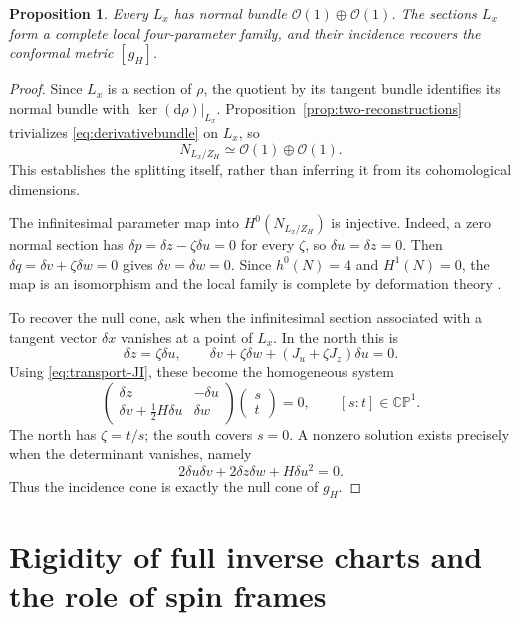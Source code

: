 \documentclass[11pt]{article}
\numberwithin{equation}{section}
\newtheorem{proposition}[theorem]{Proposition}
\theoremstyle{definition}
\theoremstyle{remark}
\newcommand{\CP}{\mathbb{CP}}
\newcommand{\OO}{\mathcal O}
\newcommand{\dd}{\mathrm d}
\begin{document}
\begin{proposition}\label{prop:normalbundle}
Every $L_x$ has normal bundle $\OO(1)\oplus\OO(1)$. The sections $L_x$ form a complete local four-parameter family, and their incidence recovers the conformal metric $[g_H]$.
\end{proposition}
\begin{proof}
Since $L_x$ is a section of $\rho$, the quotient by its tangent bundle identifies its normal bundle with $\ker(\dd\rho)|_{L_x}$. Proposition~\ref{prop:two-reconstructions} trivializes \eqref{eq:derivativebundle} on $L_x$, so
\begin{equation}\label{eq:normalbundle}
N_{L_x/Z_H}\simeq\OO(1)\oplus\OO(1).
\end{equation}
This establishes the splitting itself, rather than inferring it from its cohomological dimensions.

The infinitesimal parameter map into $H^0(N_{L_x/Z_H})$ is injective. Indeed, a zero normal section has $\delta p=\delta z-\zeta\delta u=0$ for every $\zeta$, so $\delta u=\delta z=0$. Then $\delta q=\delta v+\zeta\delta w=0$ gives $\delta v=\delta w=0$. Since $h^0(N)=4$ and $H^1(N)=0$, the map is an isomorphism and the local family is complete by deformation theory \cite{Kodaira}.

To recover the null cone, ask when the infinitesimal section associated with a tangent vector $\delta x$ vanishes at a point of $L_x$. In the north this is
\[
\delta z=\zeta\delta u,\qquad
\delta v+\zeta\delta w+(J_u+\zeta J_z)\delta u=0.
\]
Using \eqref{eq:transport-JI}, these become the homogeneous system
\begin{equation}\label{eq:incidence-null}
\begin{pmatrix}
\delta z&-\delta u\\
\delta v+\frac12H\delta u&\delta w
\end{pmatrix}
\begin{pmatrix}s\\t\end{pmatrix}=0,
\qquad [s:t]\in\CP^1.
\end{equation}
The north has $\zeta=t/s$; the south covers $s=0$. A nonzero solution exists precisely when the determinant vanishes, namely
\[
2\delta u\delta v+2\delta z\delta w+H\delta u^2=0.
\]
Thus the incidence cone is exactly the null cone of $g_H$.
\end{proof}

\section{Rigidity of full inverse charts and the role of spin frames}\label{sec:rigidity}
\end{document}
